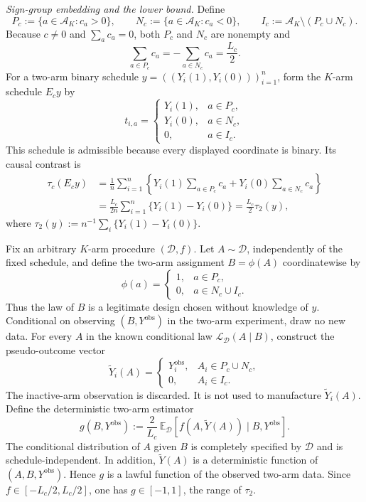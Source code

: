 \emph{Sign-group embedding and the lower bound.}
Define
\[
P_c:=\{a\in\mathcal A_K:c_a>0\},\qquad
N_c:=\{a\in\mathcal A_K:c_a<0\},\qquad
I_c:=\mathcal A_K\setminus(P_c\cup N_c).
\]
Because \(c\ne0\) and \(\sum_a c_a=0\), both \(P_c\) and \(N_c\) are nonempty and
\[
\sum_{a\in P_c}c_a=-\sum_{a\in N_c}c_a=\frac{L_c}{2}.
\]
For a two-arm binary schedule \(y=((Y_i(1),Y_i(0)))_{i=1}^n\), form the \(K\)-arm schedule \(E_cy\) by
\[
t_{i,a}=\begin{cases}
Y_i(1),&a\in P_c,\\
Y_i(0),&a\in N_c,\\
0,&a\in I_c.
\end{cases}
\]
This schedule is admissible because every displayed coordinate is binary. Its causal contrast is
\[
\begin{aligned}
\tau_c(E_cy)
&=\frac1n\sum_{i=1}^n
\left\{Y_i(1)\sum_{a\in P_c}c_a
+Y_i(0)\sum_{a\in N_c}c_a\right\}\\
&=\frac{L_c}{2n}\sum_{i=1}^n\{Y_i(1)-Y_i(0)\}
=\frac{L_c}{2}\tau_2(y),
\end{aligned}
\]
where \(\tau_2(y):=n^{-1}\sum_i\{Y_i(1)-Y_i(0)\}\).

Fix an arbitrary \(K\)-arm procedure \((\mathcal D,f)\). Let \(A\sim\mathcal D\), independently of the fixed schedule, and define the two-arm assignment \(B=\phi(A)\) coordinatewise by
\[
\phi(a)=\begin{cases}
1,&a\in P_c,\\
0,&a\in N_c\cup I_c.
\end{cases}
\]
Thus the law of \(B\) is a legitimate design chosen without knowledge of \(y\). Conditional on observing \((B,Y^{\mathrm{obs}})\) in the two-arm experiment, draw no new data. For every \(A\) in the known conditional law \(\mathcal L_{\mathcal D}(A\mid B)\), construct the pseudo-outcome vector
\[
\widetilde Y_i(A)=
\begin{cases}
Y_i^{\mathrm{obs}},&A_i\in P_c\cup N_c,\\
0,&A_i\in I_c.
\end{cases}
\]
The inactive-arm observation is discarded. It is not used to manufacture \(\widetilde Y_i(A)\). Define the deterministic two-arm estimator
\[
g(B,Y^{\mathrm{obs}})
:=\frac{2}{L_c}\,
\mathbb E_{\mathcal D}\!\left[
f(A,\widetilde Y(A))\mid B,Y^{\mathrm{obs}}
\right].
\]
The conditional distribution of \(A\) given \(B\) is completely specified by \(\mathcal D\) and is schedule-independent. In addition, \(\widetilde Y(A)\) is a deterministic function of \((A,B,Y^{\mathrm{obs}})\). Hence \(g\) is a lawful function of the observed two-arm data. Since \(f\in[-L_c/2,L_c/2]\), one has \(g\in[-1,1]\), the range of \(\tau_2\).

